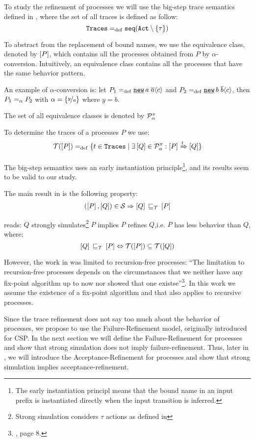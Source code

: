 To study the refinement of \picalc{} processes we will use the big-step trace semantics defined in \cite{gieseking}, where the set of all traces is defined as follow:
\[\tr \define \seqset{\actions\setminus\set{\tau}}\]

To abstract from the replacement of bound names, we use the equivalence class, denoted by $\left[P\right]$, which contains all the processes obtained from $P$ by $\alpha$-conversion. Intuitively, an equivalence class contains all the processes that have the same behavior pattern.

An example of $\alpha$-conversion is: let $P_1\define\procres{a}{\out{a}{c}}$ and $P_2\define\procres{b}{\out{b}{c}}$, then $P_1 =_\alpha{} P_2$ with $\alpha = \left\{\nicefrac{y}{a}\right\}$ where $y = b$.

The set of all equivalence classes is denoted by $\mathcal P^{\pi}_\alpha$ 

To determine the traces of a processes $P$ we use:
\begin{align}
    \traces[P] \define \{t\in \tr \mid \exists \ec{Q}\in\procsApha: \ec{P} \bigstep{t} \ec{Q}\}
\label{determine_trace}
\end{align}

The big-step semantics uses an early instantiation principle\footnote{The early instantiation principl means that the bound name in an input prefix is instantiated directly when the input transition is inferred.}, and its results seem to be valid to our study.

The main result in \cite{gieseking} is the following property:
\begin{align}
    (\ec{P},\ec{Q})\in{}\simu \Rightarrow \ec{Q} \refi \ec{P} \label{property1}
\end{align}

 reads: $Q$ strongly simulates\footnote{Strong simulation considers $\tau$ actions as defined in } $P$ implies $P$ refines $Q$,i.e. $P$ has less behavior than $Q$, where:
\[\ec{Q}\refi \ec{P} \Leftrightarrow \traces[P]\subseteq\traces[Q]\]

However, the work in \cite{gieseking} was limited to recursion-free processes: ``The limitation to recursion-free processes depends on the circumstances that we neither have any fix-point algorithm up to now nor showed that one existse''\footnote{\cite{gieseking}, page $8$.}. In this work we assume the existence of a fix-point algorithm and that  also applies to recursive processes.

Since the trace refinement does not say too much about the behavior of processes, we propose to use the Failure-Refinement model, originally introduced for CSP. In the next section we will define the Failure-Refinement for \picalc{} processes and show that strong simulation does not imply failure-refinement. Thus, later in , we will introduce the Acceptance-Refinement for \picalc{} processes and show that strong simulation implies acceptance-refinement.